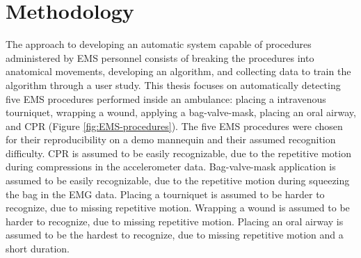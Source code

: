 
\chapter{Methodology}
\label{ch:Methodology}
The approach to developing an automatic system capable of procedures administered by EMS personnel consists of breaking the procedures into anatomical movements, developing an algorithm, and collecting data to train the algorithm through a user study. This thesis focuses on automatically detecting five EMS procedures performed inside an ambulance: placing a intravenous tourniquet, wrapping a wound, applying a bag-valve-mask, placing an oral airway, and \gls{CPR} (Figure \ref{fig:EMS-procedures}). The five EMS procedures were chosen for their reproducibility on a demo mannequin and their assumed recognition difficulty. CPR is assumed to be easily recognizable, due to the repetitive motion during compressions in the accelerometer data. Bag-valve-mask application is assumed to be easily recognizable, due to the repetitive motion during squeezing the bag in the EMG data. Placing a tourniquet is assumed to be harder to recognize, due to missing repetitive motion. Wrapping a wound is assumed to be harder to recognize, due to missing repetitive motion. Placing an oral airway is assumed to be the hardest to recognize, due to missing repetitive motion and a short duration. 
